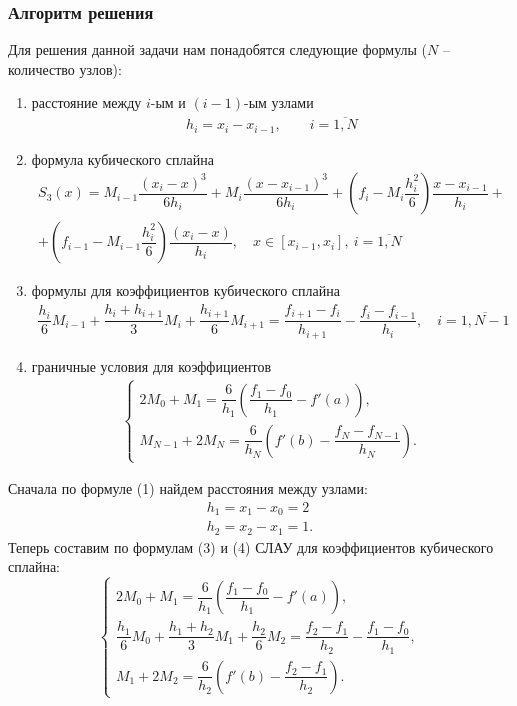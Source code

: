 \documentclass[a4paper, 12pt]{article}
\begin{document}
	\subsubsection*{Алгоритм решения}
	Для решения данной задачи нам понадобятся следующие формулы ($N$ -- количество узлов):\begin{enumerate}
		\item расстояние между $i$-ым и $(i-1)$-ым узлами \begin{eqnarray}
			h_i=x_i - x_{i-1},\qquad i=\overline{1,N}\label{1}
		\end{eqnarray}
		\item формула кубического сплайна\begin{multline}
			S_3(x) = M_{i-1}\dfrac{(x_i - x)^3}{6h_i} + M_{i}\dfrac{(x-x_{i-1})^3}{6h_i} + \left(f_i - M_i\dfrac{h_i^2}{6}\right)\dfrac{x-x_{i-1}}{h_i} +\\+ \left(f_{i-1} - M_{i-1}\dfrac{h_i^2}{6}\right)\dfrac{(x_i - x)}{h_i},\quad x\in [x_{i-1}, x_i],\ i = \overline{1,N}
		\end{multline}
		\item формулы для коэффициентов кубического сплайна
		\begin{multline}
			\dfrac{h_i}{6}M_{i-1} + \dfrac{h_i + h_{i+1}}{3}M_i + \dfrac{h_{i+1}}{6}M_{i+1} = \dfrac{f_{i+1} - f_i}{h_{i+1}} - \dfrac{f_i - f_{i-1}}{h_i},\quad i = \overline {1,N-1}
		\end{multline}
		\item граничные условия для коэффициентов \begin{eqnarray}
			\begin{cases}
				2M_0 + M_1 = \dfrac{6}{h_1}\left(\dfrac{f_1-f_0}{h_1} - f'(a)\right),\\
				M_{N-1} + 2M_N = \dfrac{6}{h_N}\left(f'(b) - \dfrac{f_N-f_{N-1}}{h_N} \right).
			\end{cases}
		\end{eqnarray}
	\end{enumerate}
	Сначала по формуле (1) найдем расстояния между узлами:
	$$\begin{matrix}
		h_1 = x_1 - x_0 = 2\\
		h_2 = x_2 - x_1 = 1.
	\end{matrix}$$
	Теперь составим по формулам (3) и (4) СЛАУ для коэффициентов кубического сплайна:
	$$\begin{cases}
		2M_0 + M_1 =  \dfrac{6}{h_1}\left(\dfrac{f_1-f_0}{h_1} - f'(a)\right),\\
		\dfrac{h_1}{6}M_{0} + \dfrac{h_1 + h_{2}}{3}M_1 + \dfrac{h_{2}}{6}M_{2} = \dfrac{f_{2} - f_1}{h_{2}} - \dfrac{f_1 - f_{0}}{h_1},\\
		M_{1} + 2M_2 = \dfrac{6}{h_2}\left(f'(b) - \dfrac{f_2-f_{1}}{h_2} \right).
	\end{cases}$$
\end{document}
